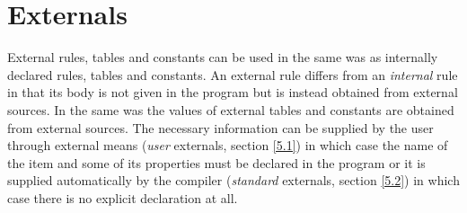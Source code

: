 \documentclass{article}
\begin{document}
\section{Externals}\label{sec:5}

External rules, tables and constants can be used in the same was as
internally declared rules, tables and constants. An external rule differs
from an \emph{internal} rule in that its body is not given in the program
but is instead obtained from external sources. In the same was the values
of external tables and constants are obtained from external sources. The
necessary information can be supplied by the user through external means
(\emph{user} externals, section \ref{5.1}) in which case the name of the item and
some of its properties must be declared in the program or it is supplied
automatically by the compiler (\emph{standard} externals, section \ref{5.2}) in
which case there is no explicit declaration at all.
\end{document}
